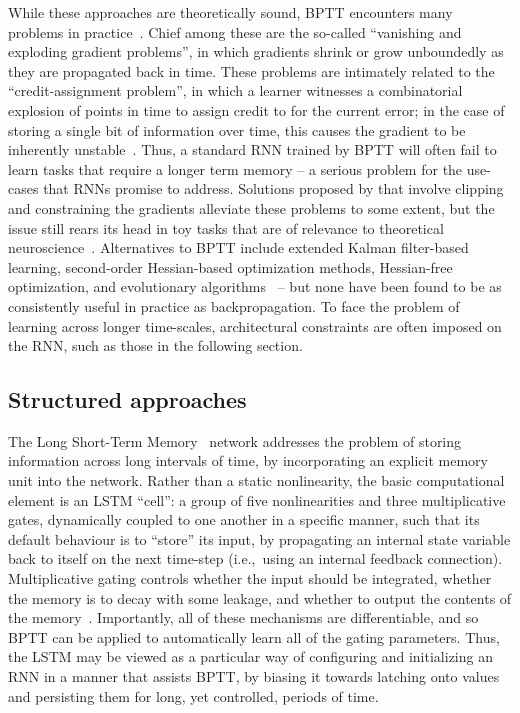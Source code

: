While these approaches are theoretically sound, BPTT encounters many problems in practice~\citep{bengio1994learning}.
Chief among these are the so-called ``vanishing and exploding gradient problems'', in which gradients shrink or grow unboundedly as they are propagated back in time.
These problems are intimately related to the ``credit-assignment problem'', in which a learner witnesses a combinatorial explosion of points in time to assign credit to for the current error; in the case of storing a single bit of information over time, this causes the gradient to be inherently unstable~\citep{bengio1994credit}.
Thus, a standard RNN trained by BPTT will often fail to learn tasks that require a longer term memory -- a serious problem for the use-cases that RNNs promise to address.
Solutions proposed by \citet{pascanu2013difficulty} that involve clipping and constraining the gradients alleviate these problems to some extent, but the issue still rears its head in toy tasks that are of relevance to theoretical neuroscience~\citep{depasquale2018full}.
Alternatives to BPTT include extended Kalman filter-based learning, second-order Hessian-based optimization methods, Hessian-free optimization, and evolutionary algorithms~\citep{salehinejad2017recent} -- but none have been found to be as consistently useful in practice as backpropagation.
To face the problem of learning across longer time-scales, architectural constraints are often imposed on the RNN, such as those in the following section.

\subsection{Structured approaches}

The Long Short-Term Memory~\citep[LSTM;][]{hochreiter1997long} network addresses the problem of storing information across long intervals of time, by incorporating an explicit memory unit into the network.
Rather than a static nonlinearity, the basic computational element is an LSTM ``cell'': a group of five nonlinearities and three multiplicative gates, dynamically coupled to one another in a specific manner, such that its default behaviour is to ``store'' its input, by propagating an internal state variable back to itself on the next time-step (i.e.,~using an internal feedback connection).
Multiplicative gating controls whether the input should be integrated, whether the memory is to decay with some leakage, and whether to output the contents of the memory~\citep{gers1999learning}.
Importantly, all of these mechanisms are differentiable, and so BPTT can be applied to automatically learn all of the gating parameters.
Thus, the LSTM may be viewed as a particular way of configuring and initializing an RNN in a manner that assists BPTT, by biasing it towards latching onto values and persisting them for long, yet controlled, periods of time.

